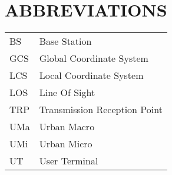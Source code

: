 \section*{ABBREVIATIONS}
 {}

\begin{tabular}{ l l }
\hspace{1cm} BS  & \hspace{4cm} Base Station\\
\hspace{1cm} GCS  & \hspace{4cm} Global Coordinate System\\
\hspace{1cm} LCS  & \hspace{4cm} Local Coordinate System\\
\hspace{1cm} LOS  & \hspace{4cm} Line Of Sight\\
\hspace{1cm} TRP  & \hspace{4cm} Transmission Reception Point \\
\hspace{1cm} UMa  & \hspace{4cm} Urban Macro\\
\hspace{1cm} UMi  & \hspace{4cm} Urban Micro\\
\hspace{1cm} UT  & \hspace{4cm} User Terminal\\
\end{tabular}  

\newpage